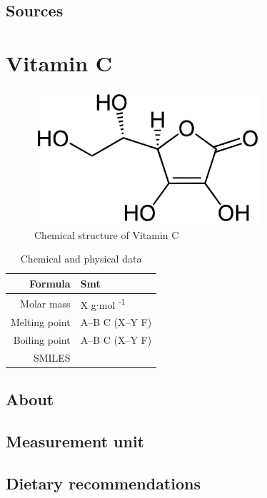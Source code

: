 \documentclass{book}
\begin{document}
\section{Sources}


\chapter{Vitamin C}
\begin{figure}[h]
	\caption{Chemical structure of Vitamin C}
	\centering \includegraphics[width=0.75\textwidth]{images/Vitamin_C_chemical_structure}
\end{figure}

\begin{table}[h]
	\caption{Chemical and physical data}
	\centering \begin{tabular}{| r | l |}
		\hline
		Formula & Smt\\ \hline
		Molar mass & X g$\cdot$mol \textsuperscript{-1}\\ \hline
		Melting point & A--B \degree C (X--Y \degree F)\\ \hline
		Boiling point & A--B \degree C (X--Y \degree F)\\ \hline
		SMILES & \\ \hline
	\end{tabular}
\end{table}
\newpage

\section{About}


\section{Measurement unit}


\section{Dietary recommendations}
\end{document}
